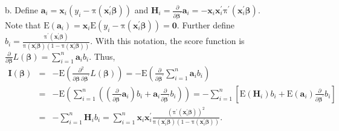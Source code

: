 b. Define $\mathbf{a}_i=\mathbf{x}_i\left( y_i-\mathrm{\pi
}(\mathbf{x} _i^{\mathbf{\prime}}\boldsymbol \beta)\right)$ and
$\mathbf{H}_i = \frac{\partial }{\partial \boldsymbol
\beta^{\prime}}\mathbf{a}_i =-\mathbf{x}_i
\mathbf{x}_i^{\mathbf{\prime}} \mathrm{\pi }^{\prime}(
\mathbf{x}_i^{\mathbf{\prime}}\boldsymbol \beta).$ \\Note that
$\mathrm{E}(\mathbf{a}_i)=\mathbf{x}_i \mathrm{E}\left(
y_i-\mathrm{\pi }(\mathbf{x} _i^{\mathbf{\prime}}\boldsymbol
\beta)\right)= \mathbf{0} $. Further define $b_i=\frac{\mathrm{\pi
}^{\prime}( \mathbf{x}_i^{\mathbf{\prime}}\boldsymbol
\beta)}{\mathrm{\pi }(\mathbf{x} _i^{\mathbf{\prime}}\boldsymbol
\beta)(1-\mathrm{\pi }(\mathbf{x}_i^{ \mathbf{\prime}}\boldsymbol
\beta))}$. With this notation, the score function is $\frac{\partial
}{\partial \boldsymbol \beta}L(\boldsymbol \beta) =
\sum\limits_{i=1}^{n} \mathbf{a}_i b_i$. Thus,
\begin{eqnarray*}
\mathbf{I}(\boldsymbol \beta) & = & - \mathrm{E} \left(
\frac{\partial^2}{\partial \boldsymbol \beta ~ \partial \boldsymbol
\beta ^{\prime}}L(\boldsymbol \beta) \right) = - \mathrm{E} \left(
\frac{\partial}{\partial \boldsymbol
\beta^{\prime}}\sum\limits_{i=1}^{n}
\mathbf{a}_i b_i\right)\\
&=& - \mathrm{E} \left( \sum\limits_{i=1}^{n} \left(
\left(\frac{\partial}{\partial \boldsymbol
\beta^{\prime}}\mathbf{a}_i \right) b_i + \mathbf{a}_i
\frac{\partial}{\partial \boldsymbol \beta^{\prime}}b_i \right)
\right) = - \sum\limits_{i=1}^{n} \left[\mathrm{E}(\mathbf{H}_i)b_i
+ \mathrm{E}(\mathbf{a}_i)
\frac{\partial}{\partial \boldsymbol \beta^{\prime}}b_i \right]\\
&=& - \sum\limits_{i=1}^{n} \mathbf{H}_i b_i  =
\sum\limits_{i=1}^{n} \mathbf{x}_i \mathbf{x}_i^{\mathbf{\prime}}
\frac {\left( \mathrm{\pi }^{\prime}(
\mathbf{x}_i^{\mathbf{\prime}}\boldsymbol \beta)\right)^2}
{\mathrm{\pi }(\mathbf{x} _i^{\mathbf{\prime}}\boldsymbol
\beta)(1-\mathrm{\pi }(\mathbf{x}_i^{
\mathbf{\prime}}\boldsymbol \beta))} .\\
\end{eqnarray*}






